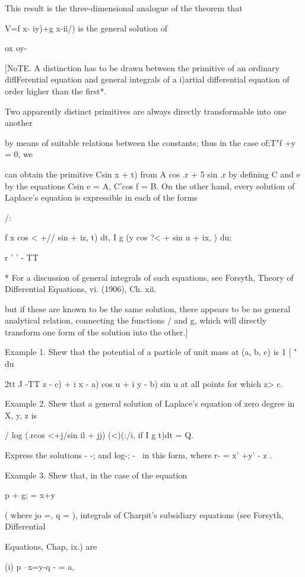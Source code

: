 This result is the three-dimensional analogue of the theorem that

V=f x- iy)+g x-ii/) is the general solution of

ox oy-

[NoTE. A distinction has to be drawn between the primitive of an
ordinary diflFerential equation and general integrals of a i)artial
differential equation of order higher than the first*.

Two apparently distinct primitives are always directly transformable
into one another

by means of suitable relations between the constants; thus in the case
of;T"f +y = 0, we

can obtain the primitive Csin x + t) from A cos .r + 5 sin .r by
defining C and e by the equations Csin e = A, C'cos f = B. On the
other hand, every solution of Laplace's equation is expressible in
each of the forms

/:

f x cos < +// sin + iz, t) dt, I g (y cos ?< + sin u + ix, ) du;

r ' ' - TT

* For a discussion of general integrals of such equations, see
Forsyth, Theory of Differential Equations, vi. (1906), Ch. xii.

%
%

but if these are known to be the same solution, there appears to be no
general analytical relation, connecting the functions / and g, which
will directly transform one form of the solution into the other.]

Example 1. Shew that the potential of a particle of unit mass at (a,
b, c) is 1 [ " du

2tt J -TT z - c) + i x - a) cos u + i y - b) sin u at all points for
which z> c.

Example 2. Shew that a general solution of Laplace's equation of zero
degree in X, y, z is

/ log (.rcos <+j/sin il + jj) (<)(:/i, if I g t)dt = Q.

Express the solutions - -; and log-; - \ in this form, where r- = x'
+y' - z .

Example 3. Shew that, in the case of the equation

p + g; = x+y

( where jo =, q = ), integrals of Charpit's subsidiary equations (see
Forsyth, Differential

Equations, Chap, ix.) are

(i) p --x=y-q - = a,

